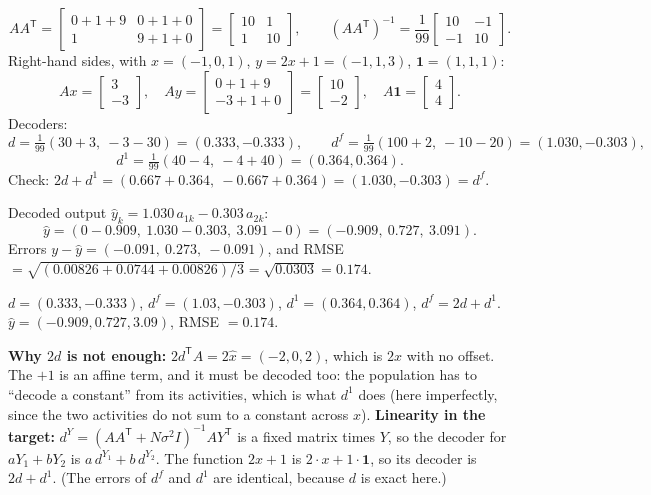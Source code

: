 \documentclass[10pt,letterpaper]{article}
\newcommand{\T}{\mathsf{T}}
\newcommand{\ans}[1]{\par\vspace{3pt}{\bfseries #1}\quad}
\begin{document}
\ans{7a.}
\[
AA^\T = \begin{bmatrix} 0+1+9 & 0+1+0 \\ 1 & 9+1+0\end{bmatrix} = \begin{bmatrix} 10 & 1 \\ 1 & 10\end{bmatrix},\qquad (AA^\T)^{-1} = \frac{1}{99}\begin{bmatrix} 10 & -1 \\ -1 & 10\end{bmatrix}.
\]
Right-hand sides, with $x = (-1, 0, 1)$, $y = 2x + 1 = (-1, 1, 3)$, $\mathbf 1 = (1, 1, 1)$:
\[
Ax = \begin{bmatrix} 3 \\ -3 \end{bmatrix},\quad Ay = \begin{bmatrix} 0 + 1 + 9 \\ -3 + 1 + 0 \end{bmatrix} = \begin{bmatrix} 10 \\ -2 \end{bmatrix},\quad A\mathbf 1 = \begin{bmatrix} 4 \\ 4\end{bmatrix}.
\]
Decoders:
\[
d = \tfrac{1}{99}(30 + 3,\ -3 - 30) = (0.333, -0.333),\qquad
d^{f} = \tfrac{1}{99}(100 + 2,\ -10 - 20) = (1.030, -0.303),
\]
\[
d^{1} = \tfrac{1}{99}(40 - 4,\ -4 + 40) = (0.364, 0.364).
\]
Check: $2d + d^1 = (0.667 + 0.364,\ -0.667 + 0.364) = (1.030, -0.303) = d^f$. \checkmark

Decoded output $\hat y_k = 1.030\,a_{1k} - 0.303\,a_{2k}$:
\[
\hat y = (0 - 0.909,\ 1.030 - 0.303,\ 3.091 - 0) = (-0.909,\ 0.727,\ 3.091).
\]
Errors $y - \hat y = (-0.091,\ 0.273,\ -0.091)$, and RMSE $= \sqrt{(0.00826 + 0.0744 + 0.00826)/3} = \sqrt{0.0303} = 0.174$.
\begin{result}
$d = (0.333, -0.333)$, $d^f = (1.03, -0.303)$, $d^1 = (0.364, 0.364)$, $d^f = 2d + d^1$. $\hat y = (-0.909, 0.727, 3.09)$, RMSE $= 0.174$.
\end{result}
\textbf{Why $2d$ is not enough:} $2d^\T A = 2\hat x = (-2, 0, 2)$, which is $2x$ with no offset. The $+1$ is an affine term, and it must be decoded too: the population has to ``decode a constant'' from its activities, which is what $d^1$ does (here imperfectly, since the two activities do not sum to a constant across $x$). \textbf{Linearity in the target:} $d^Y = (AA^\T + N\sigma^2 I)^{-1}AY^\T$ is a fixed matrix times $Y$, so the decoder for $aY_1 + bY_2$ is $a\,d^{Y_1} + b\,d^{Y_2}$. The function $2x + 1$ is $2\cdot x + 1\cdot\mathbf 1$, so its decoder is $2d + d^1$. (The errors of $d^f$ and $d^1$ are identical, because $d$ is exact here.)
\end{document}
